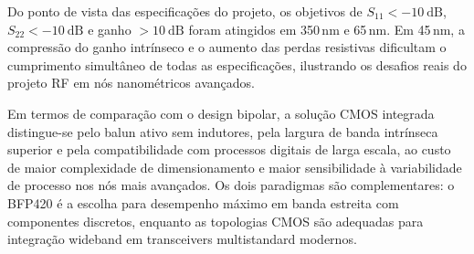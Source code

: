 Do ponto de vista das especificações do projeto, os objetivos de $S_{11} < -10~\text{dB}$,
$S_{22} < -10~\text{dB}$ e ganho $> 10~\text{dB}$ foram atingidos em 350\,nm e 65\,nm. Em 45\,nm,
a compressão do ganho intrínseco e o aumento das perdas resistivas dificultam o cumprimento
simultâneo de todas as especificações, ilustrando os desafios reais do projeto RF em nós nanométricos
avançados.

Em termos de comparação com o design bipolar, a solução CMOS integrada distingue-se pelo balun ativo
sem indutores, pela largura de banda intrínseca superior e pela compatibilidade com processos digitais
de larga escala, ao custo de maior complexidade de dimensionamento e maior sensibilidade à variabilidade
de processo nos nós mais avançados. Os dois paradigmas são complementares: o BFP420 é a escolha para
desempenho máximo em banda estreita com componentes discretos, enquanto as topologias CMOS são
adequadas para integração wideband em transceivers multistandard modernos.